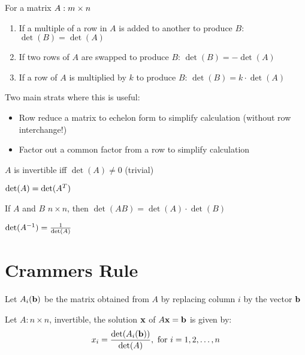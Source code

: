 \documentclass{report}
\begin{document}
\begin{theorem}\end{theorem}
\begin{tcolorbox}[colback=blue!5!white, colframe=blue!75!black, title=Row Operations]
For a matrix $A: m \times n$
\begin{enumerate}[label=\alph*.]
    \item If a multiple of a row in $A$ is added to another to produce $B$: $\det(B) = \det(A)$
    \item If two rows of $A$ are swapped to produce $B$: $\det(B) = -\det(A)$
    \item If a row of $A$ is multiplied by $k$ to produce $B$: $\det(B) = k \cdot \det(A)$
\end{enumerate}
\end{tcolorbox}
Two main strats where this is useful:
\begin{itemize}
    \item Row reduce a matrix to echelon form to simplify calculation (without row interchange!)
    \item Factor out a common factor from a row to simplify calculation 
\end{itemize}

\begin{theorem}
    $A$ is invertible iff $\det(A) \ne 0$ (trivial)
\end{theorem}

\begin{theorem}
    $\det(A) = \det(A^{T})$
\end{theorem}

\begin{theorem}
    If $A$ and $B$ $n \times n$, then $\det(AB) = \det(A) \cdot \det(B)$
\end{theorem}

\begin{lemma}
    $\det(A^{-1}) = \frac{1}{\det(A)}$
\end{lemma}

\section{Crammers Rule}
Let $A_i(\mathbf{b})$ be the matrix obtained from $A$ by replacing column $i$ by the vector $\mathbf{b}$

\begin{theorem}
    Let $A: n \times n$, invertible, the solution $\mathbf{x}$ of $A\mathbf{x} = \mathbf{b}$ is given by: \[
    x_i = \frac{\det(A_i(\mathbf{b}))}{\det(A)}, \text{   for }i = 1, 2, \ldots, n
    \]
\end{theorem}
\end{document}

